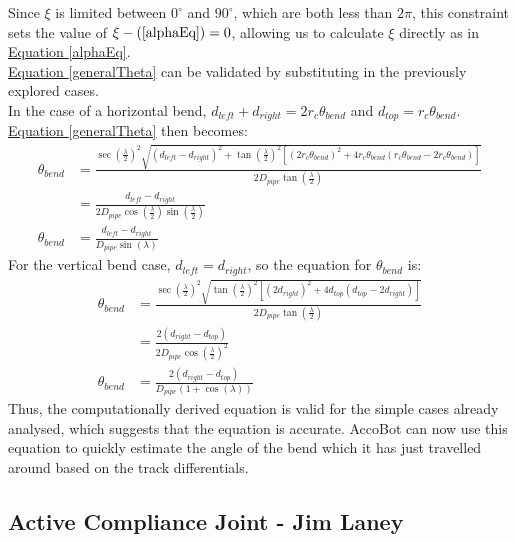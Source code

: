 \documentclass[11pt]{article}		%
\newcommand{\equationref}[1]{\hyperref[#1]{Equation \ref*{#1}}}     %
\begin{document}
			Since $\xi$ is limited between $0^\circ$ and $90^\circ$, which are both less than $2 \pi$, this constraint sets the value of $\xi - (\ref*{alphaEq}) = 0$, allowing us to calculate $\xi$ directly as in \equationref{alphaEq}.
			\\
			\equationref{generalTheta} can be validated by substituting in the previously explored cases.
			\\
			In the case of a horizontal bend, $d_{left} + d_{right} = 2 r_c \theta_{bend} $ and $d_{top} = r_c \theta_{bend}$.
			\equationref{generalTheta} then becomes:
			\begin{align*}
				\theta_{bend} &= \frac{ \sec \left( \frac{\lambda}{2} \right)^2 \sqrt{ \left( d_{left} - d_{right} \right)^2 +  \tan \left( \frac{\lambda}{2} \right)^2 \left[ \left( 2 r_c \theta_{bend} \right)^2 + 4 r_c \theta_{bend} \left( r_c \theta_{bend}  - 2 r_c \theta_{bend} \right) \right] } }{2 D_{pipe} \tan \left( \frac{\lambda}{2} \right)}
				\\
				&= \frac{d_{left} - d_{right}}{2 D_{pipe} \cos \left( \frac{\lambda}{2} \right) \sin \left( \frac{\lambda}{2} \right)}
				\\
				\theta_{bend} &= \frac{d_{left} - d_{right}}{D_{pipe} \sin \left( \lambda \right)}
			\end{align*}
			For the vertical bend case, $d_{left} = d_{right}$, so the equation for $\theta_{bend}$ is:
			\begin{align*}
				\theta_{bend} &= \frac{ \sec \left( \frac{\lambda}{2} \right)^2 \sqrt{ \tan \left( \frac{\lambda}{2} \right)^2 \left[ \left( 2 d_{right} \right)^2 + 4 d_{top} \left( d_{top} - 2 d_{right} \right) \right] } }{2 D_{pipe} \tan \left( \frac{\lambda}{2} \right)}
				\\
				&= \frac{2 \left( d_{right} - d_{top} \right)}{2 D_{pipe} \cos \left( \frac{\lambda}{2} \right)^2}
				\\
				\theta_{bend} &= \frac{2 \left( d_{right} - d_{top} \right)}{D_{pipe} \left( 1 + \cos \left( \lambda \right) \right)}
			\end{align*}
			Thus, the computationally derived equation is valid for the simple cases already analysed, which suggests that the equation is accurate.
			AccoBot can now use this equation to quickly estimate the angle of the bend which it has just travelled around based on the track differentials.
		 		
		\subsection[Active Compliance Joint]{Active Compliance Joint - Jim Laney}
		
\end{document}
